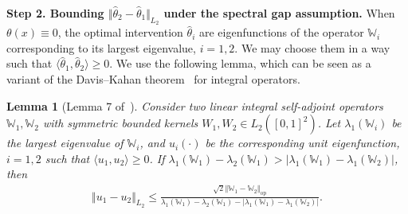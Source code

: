 \documentclass[11pt]{article}
\newcommand{\op}{\mathrm{op}}
\newcommand{\bbW}{\mathbb{W}}
\newcommand{\<}{\langle}
\renewcommand{\>}{\rangle}
\theoremstyle{plain}
\newtheorem{lemma}{Lemma}
\theoremstyle{definition}
\theoremstyle{remark}
\begin{document}
{\medskip

\noindent \textbf{Step 2. Bounding $\Vert \hat{\theta}_2 - \hat{\theta}_1 \Vert_{L_2}$ under the spectral gap assumption.} When $\theta(x) \equiv 0$, the optimal intervention $\hat{\theta}_i$ are eigenfunctions of the operator $\bbW_i$ corresponding to its largest eigenvalue, $i = 1, 2$. We may choose them in a way such that $\langle \hat{\theta}_1, \hat{\theta}_2 \rangle \ge 0$. We use the following lemma, which can be seen as a variant of the Davis--Kahan theorem~\citep{davis1970rotation} for integral operators.

\begin{lemma}[Lemma 7 of~\citep{avella-medina_centrality_2018}]
\label{lemma: operator Davis-Kahan}
    Consider two linear integral self-adjoint operators $\bbW_1, \bbW_2$ with symmetric bounded kernels $W_1, W_2 \in L_2([0, 1]^2)$. Let $\lambda_1(\bbW_i)$ be the largest eigenvalue of $\bbW_i$, and $u_i(\cdot)$ be the corresponding unit eigenfunction, $i = 1, 2$ such that $\langle u_1, u_2 \rangle \ge 0$. If $\lambda_1(\bbW_1) - \lambda_2(\bbW_1) > |\lambda_1(\bbW_1) - \lambda_1(\bbW_2)|$, then
    \begin{align*}
        \Vert u_1 - u_2 \Vert_{L_2} \le \frac{\sqrt{2} \Vert \bbW_1 - \bbW_2 \Vert_{\op}}{\lambda_1(\bbW_1) - \lambda_2(\bbW_1) - |\lambda_1(\bbW_1) - \lambda_1(\bbW_2)|}.
    \end{align*}
\end{lemma}

}
\end{document}
